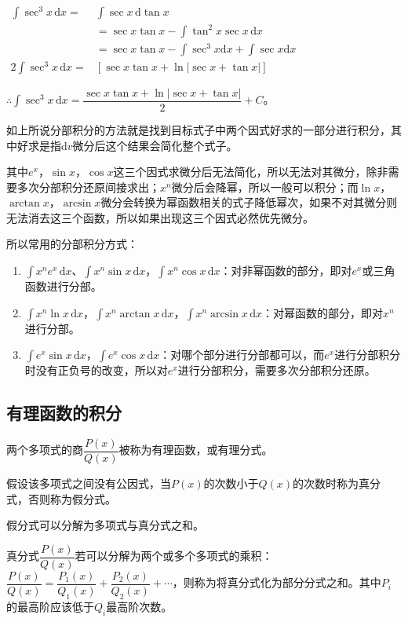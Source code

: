 \documentclass[UTF8, 12pt]{ctexart}
\begin{document}
$
\begin{aligned}
    \int\sec^3x\,\textrm{d}x =&\int\sec x\,\textrm{d}\tan x \\
    & =\sec x\tan x-\int\tan^2x\sec x\,\textrm{d}x \\
    & =\sec x\tan x-\int\sec^3x\textrm{d}x+\int\sec x\textrm{d}x \\
    2\int\sec^3x\,\textrm{d}x =&[\sec x\tan x+\ln\vert\sec x+\tan x\vert]
\end{aligned}
$

$\therefore\int\sec^3x\,\textrm{d}x =\dfrac{\sec x\tan x+\ln\vert\sec x+\tan x\vert}{2}+C$。

如上所说分部积分的方法就是找到目标式子中两个因式好求的一部分进行积分，其中好求是指$\textrm{d}v$微分后这个结果会简化整个式子。

其中$e^x$，$\sin x$，$\cos x$这三个因式求微分后无法简化，所以无法对其微分，除非需要多次分部积分还原间接求出；$x^n$微分后会降幂，所以一般可以积分；而$\ln x$，$\arctan x$，$\arcsin x$微分会转换为幂函数相关的式子降低幂次，如果不对其微分则无法消去这三个函数，所以如果出现这三个因式必然优先微分。

所以常用的分部积分方式：

\begin{enumerate}
    \item $\int x^ne^x\,\textrm{d}x$、$\int x^n\sin x\,\textrm{d}x$，$\int x^n\cos x\,\textrm{d}x$：对非幂函数的部分，即对$e^x$或三角函数进行分部。
    \item $\int x^n\ln x\,\textrm{d}x$，$\int x^n\arctan x\,\textrm{d}x$，$\int x^n\arcsin x\,\textrm{d}x$：对幂函数的部分，即对$x^n$进行分部。
    \item $\int e^x\sin x\,\textrm{d}x$，$\int e^x\cos x\,\textrm{d}x$：对哪个部分进行分部都可以，而$e^x$进行分部积分时没有正负号的改变，所以对$e^x$进行分部积分，需要多次分部积分还原。
\end{enumerate}

\subsection{有理函数的积分}

两个多项式的商$\dfrac{P(x)}{Q(x)}$被称为有理函数，或有理分式。

假设该多项式之间没有公因式，当$P(x)$的次数小于$Q(x)$的次数时称为真分式，否则称为假分式。

假分式可以分解为多项式与真分式之和。

真分式$\dfrac{P(x)}{Q(x)}$若可以分解为两个或多个多项式的乘积：$\dfrac{P(x)}{Q(x)}=\dfrac{P_1(x)}{Q_1(x)}+\dfrac{P_2(x)}{Q_2(x)}+\cdots$，则称为将真分式化为部分分式之和。其中$P_i$的最高阶应该低于$Q_i$最高阶次数。
\end{document}
